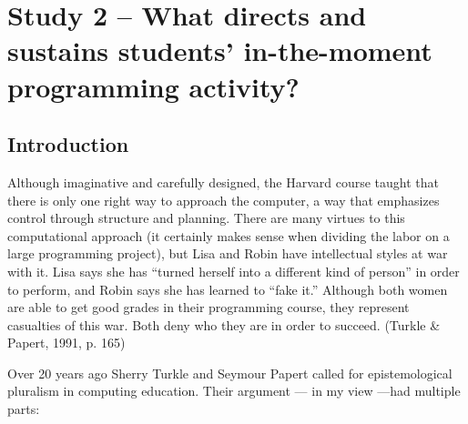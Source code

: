 \section{\texorpdfstring{\protect\hypertarget{ux5fToc247188552}{}{\protect\hypertarget{ux5fToc252445913}{}{}}Study
2 -- What directs and sustains students' in-the-moment programming
activity?}{Study 2 -- What directs and sustains students' in-the-moment programming activity?}}\label{study-2-what-directs-and-sustains-students-in-the-moment-programming-activity}

\subsection{Introduction}\label{introduction-2}

Although imaginative and carefully designed, the Harvard course taught
that there is only one right way to approach the computer, a way that
emphasizes control through structure and planning. There are many
virtues to this computational approach (it certainly makes sense when
dividing the labor on a large programming project), but Lisa and Robin
have intellectual styles at war with it. Lisa says she has ``turned
herself into a different kind of person'' in order to perform, and Robin
says she has learned to ``fake it.'' Although both women are able to get
good grades in their programming course, they represent casualties of
this war. Both deny who they are in order to succeed. (Turkle \& Papert,
1991, p. 165)

Over 20 years ago Sherry Turkle and Seymour Papert called for
epistemological pluralism in computing education. Their argument --- in
my view ---had multiple parts:

